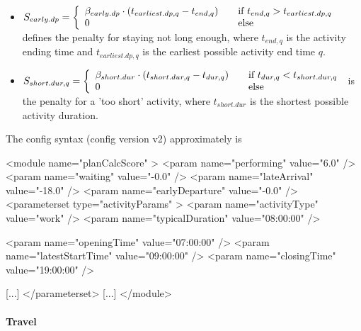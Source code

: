 \begin{itemize}
\medskip

\item $S_{early.dp} = \left\{
  \begin{array}{l l}
    \beta_{early.dp} \cdot (t_{earliest.dp, q} - t_{end,q}) & \quad \text{if $t_{end,q} > t_{earliest.dp,q}$}\\
    0 & \quad \text{else}
  \end{array} \right.$
%
defines the penalty for staying not long enough, where $t_{end,q}$ is the activity ending time and $t_{earliest.dp,q}$ is the earliest possible activity end time $q$.

\medskip

\item $ S_{short.dur, q} = \left\{
  \begin{array}{l l}
    \beta_{short.dur} \cdot (t_{short.dur, q} - t_{dur,q}) & \quad \text{if $t_{dur,q} < t_{short.dur,q}$}\\
    0 & \quad \text{else}
  \end{array} \right.$
%  
  is the penalty for a 'too short' activity, where $t_{short.dur}$ is the shortest possible activity duration.
\end{itemize}

The config syntax (config version v2) approximately is
\begin{xml}
<module name="planCalcScore" >
   <param name="performing" value="6.0" />
   <param name="waiting" value="-0.0" />
   <param name="lateArrival" value="-18.0" />
   <param name="earlyDeparture" value="-0.0" />
   <parameterset type="activityParams" >
		 <param name="activityType" value="work" />
		 <param name="typicalDuration" value="08:00:00" />

		 <param name="openingTime" value="07:00:00" />
		 <param name="latestStartTime" value="09:00:00" />
		 <param name="closingTime" value="19:00:00" />

      [...]   
   </parameterset>
   [...]   
</module>
\end{xml}


\paragraph{Travel} 

